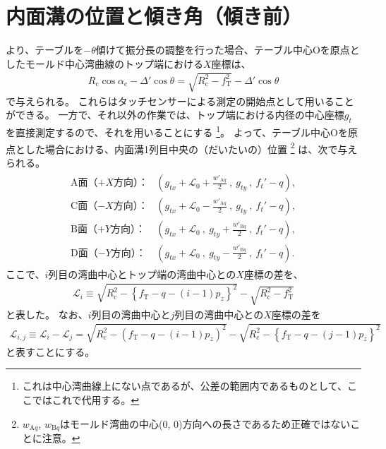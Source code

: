 \section{内面溝の位置と傾き角（傾き前）}
より、テーブルを$-\theta$傾けて振分長の調整を行った場合、テーブル中心Oを原点としたモールド中心湾曲線のトップ端における$X$座標は、
\begin{align*}
  R_\mathrm c\cos\alpha_\mathrm c-\varDelta'\cos\theta = \sqrt{R_\mathrm c^2-f_\mathrm T^2}-\varDelta'\cos\theta
\end{align*}
で与えられる。
これらはタッチセンサーによる測定の開始点として用いることができる。
一方で、それ以外の作業では、トップ端における内径の中心座標$g_t$を直接測定するので、それを用いることにする
\footnote{これは中心湾曲線上にない点であるが、公差の範囲内であるものとして、ここではこれで代用する。}。
よって、テーブル中心Oを原点とした場合における、内面溝1列目中央の（だいたいの）位置
\footnote{$w_{\mathrm Aq}$, $w_{\mathrm Bq}$はモールド湾曲の中心(0, 0)方向への長さであるため正確ではないことに注意。}\relax
は、次で与えられる。
\begin{align*}
\begin{array}{rl}
  \text{A面（$+X$方向）：}
  & \displaystyle
    \left(
      g_{tx}+\mathcal L_0+\frac{w'_{\mathrm Aq}}2~,~
      g_{ty}~,~
      f_t'-q
    \right),\\[12pt]
  \text{C面（$-X$方向）：}
  & \displaystyle
    \left(
      g_{tx}+\mathcal L_0-\frac{w'_{\mathrm Aq}}2~,~
      g_{ty}~,~
      f_t'-q
    \right),\\[12pt]
  \text{B面（$+Y$方向）：}
  & \displaystyle
    \left(
      g_{tx}+\mathcal L_0~,~
      g_{ty}+\frac{w'_{\mathrm Bq}}2~,~
      f_t'-q
    \right),\\[12pt]
  \text{D面（$-Y$方向）：}
  & \displaystyle
    \left(
      g_{tx}+\mathcal L_0~,~
      g_{ty}-\frac{w'_{\mathrm Bq}}2~,~
      f_t'-q
    \right).
\end{array}
\end{align*}
ここで、$i$列目の湾曲中心とトップ端の湾曲中心との$X$座標の差を、
\begin{align}
  \label{eq:dimpleCenterDistance}
  \mathcal L_i
  \equiv \sqrt{R_\mathrm c^2-\left\{f_\mathrm T-q-(i-1)p_z\right\}^2}-\sqrt{R_\mathrm c^2-f_\mathrm T^2}
\end{align}
と表した。
なお、$i$列目の湾曲中心と$j$列目の湾曲中心との$X$座標の差を
\begin{align*}
  \mathcal L_{i,j}
  \equiv \mathcal L_i-\mathcal L_j
  = \sqrt{R_\mathrm c^2-\left(f_\mathrm T-q-(i-1)p_z\right)^2}
    -\sqrt{R_\mathrm c^2-\left\{f_\mathrm T-q-(j-1)p_z\right\}^2}
\end{align*}
と表すことにする。



